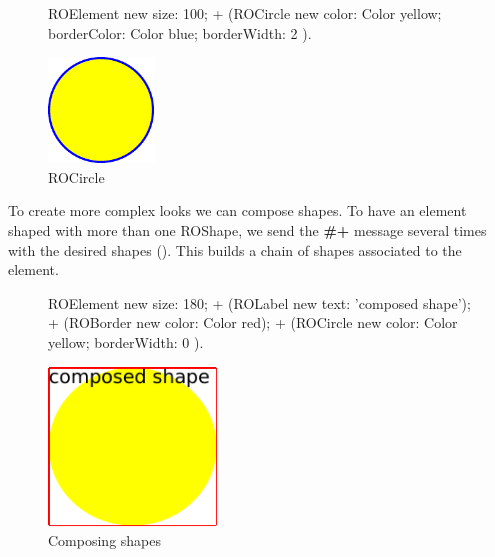 \documentclass[a4paper,10pt,twoside]{book}
\begin{document}
\begin{figure}[H]
      \begin{minipage}[t]{0.5\textwidth}
      \vspace{0pt}
     \begin{code}
     
ROElement new 
	size: 100; 
	+ (ROCircle new 
				color: Color yellow; 
				borderColor: Color blue; 
				borderWidth: 2 ).	\end{code}
   \end{minipage}
   \hfill
   \begin{minipage}[t]{0.4\textwidth}
      \vspace{0pt} \raggedright
       \centering
		\includegraphics[width=0.25\textwidth]{circle}     
   \end{minipage}
\caption{ROCircle}
\label{fig:circle}
\end{figure}

To create more complex looks we can compose shapes. To have an element shaped with more than one ROShape, we send the \textbf{\#+} message several times with the desired shapes (). This builds a chain of shapes associated to the element.

\begin{figure}[H]
      \begin{minipage}[t]{0.5\textwidth}
      \vspace{0pt}
     \begin{code}
     
ROElement new 
	size: 180;  
	+ (ROLabel new text: 'composed shape');
	+ (ROBorder new color: Color red); 
	+ (ROCircle new color: Color yellow; 
					borderWidth: 0 ).	\end{code}
   \end{minipage}
   \hfill
   \begin{minipage}[t]{0.4\textwidth}
      \vspace{0pt} \raggedright
       \centering
		\includegraphics[width=0.4\textwidth]{composed}
   \end{minipage}
\caption{Composing shapes}
\label{fig:composed}
\end{figure} 
\end{document}
